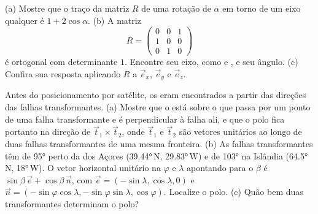\begin{exercise}[$\star\star\star$]\label{exo:b1:plate-kinematics:10}
(a) Mostre que o traço da matriz $R$ de uma rotação de $\alpha$ em torno de um eixo
qualquer é $1 + 2\cos\alpha$. (b) A matriz
\[
  R = \begin{pmatrix} 0 & 0 & 1\\ 1 & 0 & 0\\ 0 & 1 & 0\end{pmatrix}
\]
é ortogonal com determinante $1$. Encontre seu eixo, como  e ,
e seu ângulo. (c) Confira sua resposta aplicando $R$ a $\vec e_x$, $\vec e_y$
e $\vec e_z$.
\end{exercise}

\begin{exercise}[$\star\star\star$]\label{exo:b1:plate-kinematics:11}
Antes do posicionamento por satélite, os  eram encontrados a partir das direções das
falhas transformantes. (a) Mostre que o  está sobre o  que passa por um ponto de uma falha transformante e é perpendicular à falha ali, e que o polo fica portanto na direção de $\vec t_1\times\vec t_2$, onde $\vec t_1$ e
$\vec t_2$ são vetores unitários ao longo de duas falhas transformantes de uma mesma fronteira.
(b) As falhas transformantes têm  de \ang{95} perto da  dos Açores
(\ang{39.44}\,N, \ang{29.83}\,W) e de \ang{103} na Islândia (\ang{64.5}\,N,
\ang{18}\,W). O vetor horizontal unitário na  $\varphi$ e 
$\lambda$ apontando para o  $\beta$ é $\sin\beta\,\vec e +
\cos\beta\,\vec n$, com $\vec e = (-\sin\lambda, \cos\lambda, 0)$ e $\vec n =
(-\sin\varphi\cos\lambda, -\sin\varphi\sin\lambda, \cos\varphi)$. Localize o
polo. (c) Quão bem duas transformantes determinam o polo?
\end{exercise}

